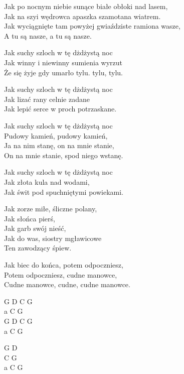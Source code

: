 \begin{text}
    Jak po nocnym niebie sunące białe obłoki nad lasem,\\
    Jak na szyi wędrowca apaszka szamotana wiatrem.\\
    Jak wyciągnięte tam powyżej gwiaździste ramiona wasze,\\
    A tu są nasze, a tu są nasze.

    Jak suchy szloch w tę dżdżystą noc\\
    Jak winny i niewinny sumienia wyrzut\\
    Że się żyje gdy umarło tylu. tylu, tylu.

    Jak suchy szloch w tę dżdżystą noc\\
    Jak lizać rany celnie zadane\\
    Jak lepić serce w proch potrzaskane.

    Jak suchy szloch w tę dżdżystą noc\\
    Pudowy kamień, pudowy kamień,\\
    Ja na nim stanę, on na mnie stanie,\\
    On na mnie stanie, spod niego wstanę.

    Jak suchy szloch w tę dżdżystą noc\\
    Jak złota kula nad wodami,\\
    Jak świt pod spuchniętymi powiekami.

    Jak zorze miłe, śliczne polany,\\
    Jak słońca pierś,\\
    Jak garb swój nieść,\\
    Jak do was, siostry mgławicowe\\
    Ten zawodzący śpiew.

    Jak biec do końca, potem odpoczniesz,\\
    Potem odpoczniesz, cudne manowce,\\
    Cudne manowce, cudne, cudne manowce.
\end{text}
\begin{chord}
    G D C G\\
    a C G\\
    G D C G\\
    a C G

    G D\\
    C G\\
    a C G
\end{chord}

